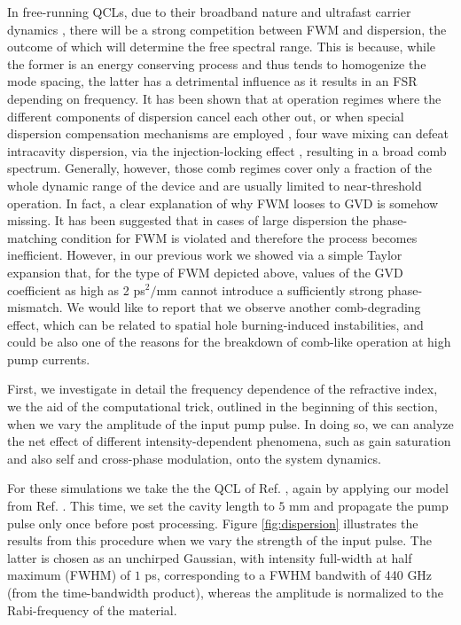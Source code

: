 \documentclass[journal]{IEEEtran}
\begin{document}
	In free-running QCLs, due to their broadband nature and ultrafast carrier dynamics \cite{khurgin2014coherent}, there will be a strong competition between FWM and dispersion, the outcome of which will determine the free spectral range. This is because, while the former is an energy conserving process and thus tends to homogenize the mode spacing, the latter has a detrimental influence as it results in an FSR depending on frequency. It has been shown \cite{rosch2015octave} that at operation regimes where the different components of dispersion cancel each other out, or when special dispersion compensation mechanisms are employed \cite{burghoff2014terahertz}, four wave mixing can defeat intracavity dispersion, via the injection-locking effect \cite{siegman1986lasers}, resulting in a broad comb spectrum. Generally, however, those comb regimes cover only a fraction of the whole dynamic range of the device and are usually limited to near-threshold operation. In fact, a clear explanation of why FWM looses to GVD   is somehow missing. It has been suggested \cite{villares2016dispersion} that in cases of large dispersion the phase-matching condition for FWM is violated and therefore the process becomes inefficient. 
	However, in our previous work \cite{petz2016} we showed via a simple Taylor expansion that, for the type of FWM depicted above, values of the GVD coefficient as high as 2 ps$^2/$mm cannot introduce a sufficiently strong phase-mismatch. We would like to report that we observe another comb-degrading effect, which can be related to spatial hole burning-induced instabilities, and could be also one of the reasons for the breakdown of comb-like operation at high pump currents.  
	
	First, we investigate in detail the frequency dependence of the refractive index, we the aid of the computational trick, outlined in the beginning of this section, when we vary the amplitude of the input pump pulse. In doing so, we can analyze the net effect of different intensity-dependent phenomena, such as gain saturation and also self and cross-phase modulation, onto the system dynamics. 
	
	For these simulations we take the the QCL of Ref. \cite{burghoff2014terahertz}, again by applying our model from Ref. \cite{petz2016}. This time, we set the cavity length to $5$ mm and propagate the pump pulse only once before post processing. Figure \ref{fig:dispersion} illustrates the results from this procedure when we vary the strength of the input pulse. The latter is chosen as an unchirped Gaussian, with intensity full-width at half maximum (FWHM) of $1$ ps,  corresponding to a FWHM bandwith of 440 GHz (from the time-bandwidth product), whereas the amplitude is normalized to the Rabi-frequency of the material. 
	
\end{document}
